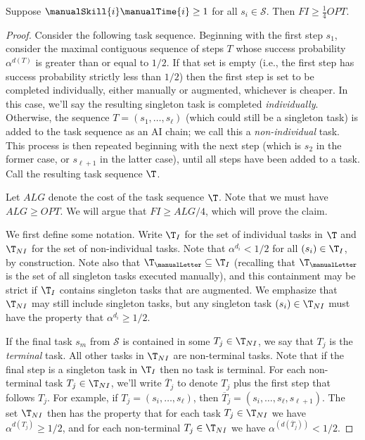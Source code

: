 \begin{proposition}
\label{prop:FI.lower.bound.4}
    Suppose $\manualSkill{i}\manualTime{i} \geq 1$ for all $s_i \in \mathcal{S}$. 
    Then $FI \geq \tfrac{1}{4}OPT$.
\end{proposition}
\begin{proof}

    Consider the following task sequence.  
    Beginning with the first step $s_1$, consider the maximal contiguous sequence of steps $T$ whose success probability $\alpha^{d(T)}$ is greater than or equal to $1/2$.  
    If that set is empty (i.e., the first step has success probability strictly less than $1/2$) then the first step is set to be completed individually, either manually or augmented, whichever is cheaper.  
    In this case, we'll say the resulting singleton task is completed \emph{individually}. 
    Otherwise, the sequence $T = (s_1, \dotsc, s_\ell)$ (which could still be a singleton task) is added to the task sequence as an AI chain; we call this a \emph{non-individual} task.  
    This process is then repeated beginning with the next step (which is $s_2$ in the former case, or $s_{\ell+1}$ in the latter case), until all steps have been added to a task.  
    Call the resulting task sequence $\T$.

    \medskip
    
    Let $ALG$ denote the cost of the task sequence $\T$.  
    Note that we must have $ALG \geq OPT$. 
    We will argue that $FI \geq ALG/4$, which will prove the claim.

    \medskip

    We first define some notation.  
    Write $\T_I$ for the set of individual tasks in $\T$ and $\T_{NI}$ for the set of non-individual tasks.
    Note that $\alpha^{d_i} < 1/2$ for all $(s_i) \in \T_I$, by construction.  
    Note also that $\T_{\manualLetter} \subseteq \T_I$ (recalling that $\T_{\manualLetter}$ is the set of all singleton tasks executed manually), and this containment may be strict if $\T_I$ contains singleton tasks that are augmented.  
    We emphasize that $\T_{NI}$ may still include singleton tasks, but any singleton task $(s_i) \in \T_{NI}$ must have the property that $\alpha^{d_i} \geq 1/2$.
 
    If the final task $s_m$ from $\mathcal{S}$ is contained in some $T_j \in \T_{NI}$, we say that $T_j$ is the \emph{terminal} task.  
    All other tasks in $\T_{NI}$ are non-terminal tasks.  Note that if the final step is a singleton task in $\T_I$ then no task is terminal.  
    For each non-terminal task $T_j \in \T_{NI}$, we'll write $\overline{T}_j$ to denote $T_j$ plus the first step that follows $T_j$. 
    For example, if $T_j = (s_i, \dotsc, s_\ell)$, then $\overline{T}_j = (s_i, \dotsc, s_\ell, s_{\ell+1})$.
    The set $\T_{NI}$ then has the property that for each task $T_j \in \T_{NI}$ we have $\alpha^{d(T_j)} \geq 1/2$, and for each non-terminal $T_j \in \T_{NI}$ we have $\alpha^{(d(\overline{T}_j))} < 1/2$.


\end{proof}
